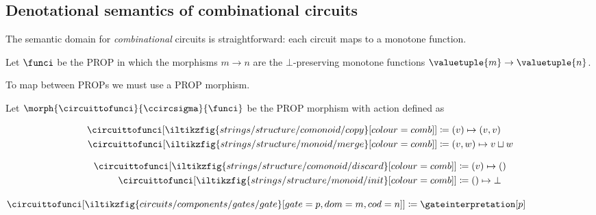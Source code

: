 \documentclass{lmcs}
\begin{document}
\subsection{Denotational semantics of combinational circuits}

The semantic domain for \emph{combinational} circuits is straightforward: each
circuit maps to a monotone function.

\begin{defi}
    Let \(\funci\) be the PROP in which the morphisms
    \(m \to n\) are the \(\bot\)-preserving monotone
    functions \(\valuetuple{m} \to \valuetuple{n}\).
\end{defi}

To map between PROPs we must use a PROP morphism.

\begin{defi}
    Let \(\morph{\circuittofunci}{\ccircsigma}{\funci}\) be the PROP morphism
    with action defined as%
    \vspace{-\abovedisplayskip}
    \begin{center}
        \begin{minipage}{0.32\textwidth}
            \centering
            \begin{align*}
                \circuittofunci[
                    \iltikzfig{strings/structure/comonoid/copy}[colour=comb]
                ]
                 & \coloneqq
                (v) \mapsto (v, v)
                \\
                \circuittofunci[
                    \iltikzfig{strings/structure/monoid/merge}[colour=comb]
                ]
                 & \coloneqq
                (v, w) \mapsto v \sqcup w
            \end{align*}
        \end{minipage}
        \quad
        \begin{minipage}{0.25\textwidth}
            \centering
            \begin{align*}
                \circuittofunci[
                    \iltikzfig{strings/structure/comonoid/discard}[colour=comb]
                ]
                 & \coloneqq
                (v) \mapsto ()
                \\
                \circuittofunci[
                    \iltikzfig{strings/structure/monoid/init}[colour=comb]
                ]
                 & \coloneqq
                () \mapsto \bot
            \end{align*}
        \end{minipage}
        \quad
        \begin{minipage}{0.25\textwidth}
            \centering
            \vspace{1.5em}
            \(\circuittofunci[
                \iltikzfig{circuits/components/gates/gate}[gate=p,dom=m,cod=n]
            ]
            \coloneqq
            \gateinterpretation[p]
            \)
        \end{minipage}
    \end{center}
\end{defi}
\end{document}
